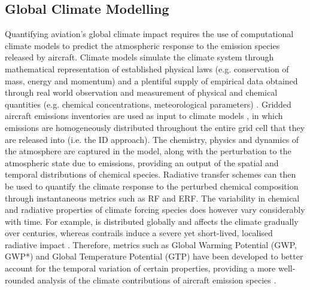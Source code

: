 \subsection{Global Climate Modelling}
\label{Climate_modelling}
Quantifying aviation's global climate impact requires the use of computational climate models to predict the atmospheric response to the emission species released by aircraft. Climate models simulate the climate system through mathematical representation of established physical laws (e.g. conservation of mass, energy and momentum) and a plentiful supply of empirical data obtained through real world observation and measurement of physical and chemical quantities (e.g. chemical concentrations, meteorological parameters) \cite{Randall2007}. Gridded aircraft emissions inventories are used as input to climate models \cite{Olsen2013, Wilkerson2010}, in which emissions are homogeneously distributed throughout the entire grid cell that they are released into (i.e. the ID approach). The chemistry, physics and dynamics of the atmosphere are captured in the model, along with the perturbation to the atmospheric state due to emissions, providing an output of the spatial and temporal distributions of chemical species. Radiative transfer schemes can then be used to quantify the climate response to the perturbed chemical composition through instantaneous metrics such as RF and ERF. The variability in chemical and radiative properties of climate forcing species does however vary considerably with time. For example,  is distributed globally and affects the climate gradually over centuries, whereas contrails induce a severe yet short-lived, localised radiative impact \cite{Lee2021}. Therefore, metrics such as Global Warming Potential (GWP, GWP*) and Global Temperature Potential (GTP) have been developed to better account for the temporal variation of certain properties, providing a more well-rounded analysis of the climate contributions of aircraft emission species \cite{Fuglestvedt2003, Fuglestvedt2010, Cain2019}.

